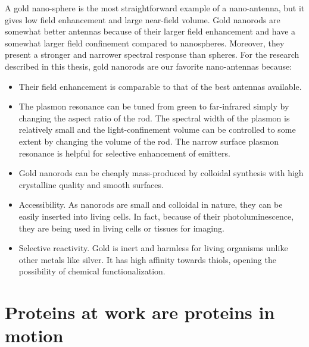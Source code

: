 A gold nano-sphere is the most straightforward example of a nano-antenna, but it gives low field enhancement and large near-field volume.\cite{punj2013gold}
Gold nanorods are somewhat better antennas because of their larger field enhancement and have a somewhat larger field confinement compared to nanospheres.
Moreover, they present a stronger and narrower spectral response than spheres. For the research described in this thesis, gold nanorods are our favorite nano-antennas because:
\begin{itemize}
	\item Their field enhancement is comparable to that of the best antennas available.
	\item The plasmon resonance can be tuned from green to far-infrared simply by changing the aspect ratio of the rod.\cite{link1999simulation}
	The spectral width of the plasmon is relatively small and the light-confinement volume can be controlled to some extent by changing the volume of the rod.
	The narrow surface plasmon resonance is helpful for selective enhancement of emitters.\cite{yuan2013thousandfold,khatua2014resonant}
	\item Gold nanorods can be cheaply mass-produced by colloidal synthesis with high crystalline quality and smooth surfaces.\cite{nikoobakht2003preparation,perezjuste2005gold}
	\item Accessibility. As nanorods are small and colloidal in nature, they can be easily inserted into living cells.\cite{el2005surface,chithrani2007elucidating,pan2007size,lvy2010gold,moser2016cellular}
	In fact, because of their photoluminescence, they are being used in living cells or tissues for imaging.
	\item Selective reactivity. Gold is inert and harmless for living organisms unlike other metals like silver.
	It has high affinity towards thiols, opening the possibility of chemical functionalization.
\end{itemize}
%
\section{Proteins at work are proteins in motion}

